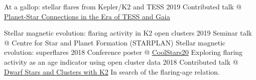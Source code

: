 \documentclass[9.5pt]{k-cv} %
\begin{document}
\begin{entrylist}
{At a gallop: stellar flares from Kepler/K2 and TESS}
\entry
{2019}
{Contributed talk @ \href{https://www.kitp.ucsb.edu/activities/exostar-c19}{Planet-Star Connections in the Era of TESS and Gaia}}
{}%

{Stellar magnetic evolution: flaring activity in K2 open clusters}
\entry
{2019}
{Seminar talk @ Centre for Star and Planet Formation (STARPLAN)}
{}%
{Stellar magnetic evolution: superflares}
\entry
{2018}
{Conference poster @ \href{http://coolstars20.cfa.harvard.edu/}{CoolStars20}}
{}%
{Exploring flaring activity as an age indicator using open cluster data}
\entry
{2018}
{Contributed talk @ \href{https://keplergo.github.io/KeplerScienceWebsite/workshop-on-dwarf-stars-and-clusters-with-k2-registration-now-open-space-is-limited.html}{Dwarf Stars and Clusters with K2}}
{}%
{In search of the flaring-age relation.}
\end{entrylist}


%

\newpage
\end{document}

